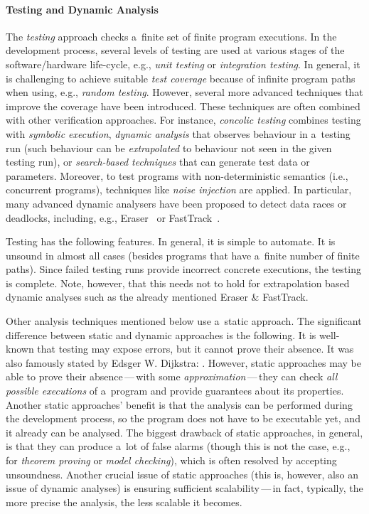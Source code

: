 \paragraph{Testing and Dynamic Analysis}
The \emph{testing} approach checks a~finite set of finite program executions. In the development process, several levels of testing are used at various stages of the software/hardware life-cycle, e.g., \emph{unit testing} or \emph{integration testing}. In general, it is challenging to achieve suitable \emph{test coverage} because of infinite program paths when using, e.g., \emph{random testing}. However, several more advanced techniques that improve the coverage have been introduced. These techniques are often combined with other verification approaches. For instance, \emph{concolic testing} combines testing with \emph{symbolic execution}, \emph{dynamic analysis} that observes behaviour in a~testing run (such behaviour can be \emph{extrapolated} to behaviour not seen in the given testing run), or \emph{search-based techniques} that can generate test data or parameters. Moreover, to test programs with non-deterministic semantics (i.e., concurrent programs), techniques like \emph{noise injection} are applied. In particular, many advanced dynamic analysers have been proposed to detect data races or deadlocks, including, e.g., Eraser~\cite{eraser} or FastTrack~\cite{fastTrack}.

Testing has the following features. In general, it is simple to automate. It is unsound in almost all cases (besides programs that have a~finite number of finite paths). Since failed testing runs provide incorrect concrete executions, the testing is complete. Note, however, that this needs not to hold for extrapolation based dynamic analyses such as the already mentioned Eraser \& FastTrack.

Other analysis techniques mentioned below use a~static approach. The significant difference between static and dynamic approaches is the following. It is well-known that testing may expose errors, but it cannot prove their absence. It was also famously stated by Edsger W. Dijkstra: . However, static approaches may be able to prove their absence\,---\,with some \emph{approximation}\,---\,they can check \emph{all possible executions} of a~program and provide guarantees about its properties. Another static approaches' benefit is that the analysis can be performed during the development process, so the program does not have to be executable yet, and it already can be analysed. The biggest drawback of static approaches, in general, is that they can produce a~lot of false alarms (though this is not the case, e.g., for \emph{theorem proving} or \emph{model checking}), which is often resolved by accepting unsoundness. Another crucial issue of static approaches (this is, however, also an issue of dynamic analyses) is ensuring sufficient scalability\,---\,in fact, typically, the more precise the analysis, the less scalable it becomes.

